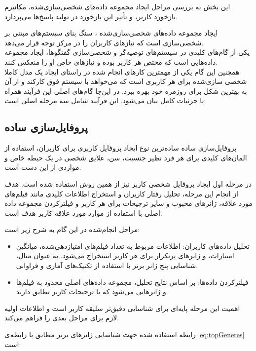 \begin{enumerate}
این بخش به بررسی مراحل ایجاد مجموعه داده‌های شخصی‌سازی‌شده، مکانیزم بازخورد کاربر، و تأثیر این بازخورد در تولید پاسخ‌ها می‌پردازد.

ایجاد مجموعه داده‌های شخصی‌سازی‌شده%
، سنگ بنای سیستم‌های مبتنی بر شخصی‌سازی است که نیازهای کاربران را در مرکز توجه قرار می‌دهد. \\
یکی از گام‌های کلیدی در سیستم‌های توصیه‌گر و شخصی‌سازی گفتگوها، ایجاد مجموعه داده‌هایی است که مختص هر کاربر بوده و نیازهای خاص او را منعکس کنند. \\
همچنین این گام یکی از مهمترین کارهای انجام شده در راستای ایجاد یک مدل کاملا شخصی سازی‌شده برای هر کاربری است که می‌خواهد با سیستم فوق کارکند و از آن به بهترین شکل برای روزمره خود بهره ببرد.
در این‌جا گام‌های اصلی این فرآیند همراه با جزئیات کامل بیان می‌شود. این فرآیند شامل سه مرحله اصلی است:

\subsection{پروفایل‌سازی ساده}
پروفایل‌سازی ساده%
 ساده‌ترین نوع ایجاد پروفایل کاربری برای کاربران، استفاده از المان‌های کلیدی برای هر فرد نظیر جنسیت، سن، علایق شخصی در یک حیطه خاص و مواردی از این دست است.

در مرحله اول ایجاد پروفایل شخصی کاربر نیز از همین روش استفاده شده است.
هدف از انجام این مرحله، تحلیل رفتار کاربران و استخراج اطلاعات کلیدی مانند فیلم‌های مورد علاقه، ژانرهای محبوب و سایر ترجیحات برای هر کاربر و فیلترکردن مجموعه داده اصلی با استفاده از موارد مورد علاقه کاربر هدف است. 


مراحل انجام‌شده در این گام به شرح زیر است:\\
\begin{itemize}
\item
تحلیل داده‌های کاربران: اطلاعات مربوط به تعداد فیلم‌های امتیازدهی‌شده، میانگین امتیازات، و ژانرهای پرتکرار برای هر کاربر استخراج می‌شود. به عنوان مثال، شناسایی پنج ژانر برتر با استفاده از تکنیک‌های آماری و فراوانی.
\item
فیلترکردن داده‌ها: بر اساس نتایج تحلیل، مجموعه داده‌های اصلی محدود به فیلم‌ها و ژانرهایی می‌شود که با ترجیحات کاربر تطابق دارند.
\end{itemize}

اهمیت این مرحله پایه‌ای برای شناسایی دقیق‌تر سلیقه کاربر است و اطلاعات اولیه لازم برای مراحل بعدی را فراهم می‌کند.

رابطه استفاده شده جهت شناسایی ژانرهای برتر مطابق با رابطه ی %
\ref{eq:topGeneres} 
 است:


\end{enumerate}
